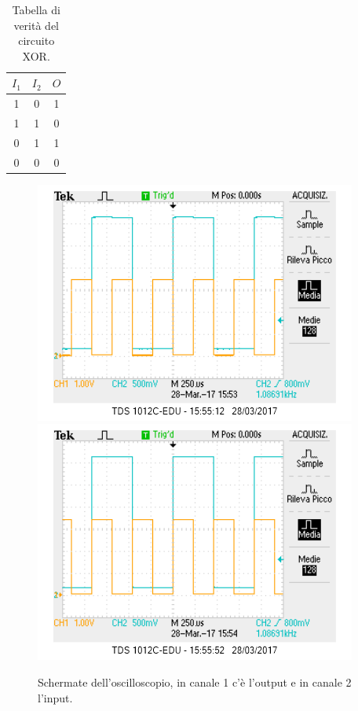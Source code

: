 \documentclass[10pt,a4paper]{article}
\begin{document}
\begin{table}[!htb]
\centering
\begin{tabular}{|c|c|c|}
\hline 
$I_1$ & $I_2$ & $O$ \\
\hline
 1 &  0 & 1\\ 
 
 1 &  1 & 0\\ 

 0 &  1 & 1\\ 

 0 &  0 & 0\\ 
\hline 
\end{tabular} 
\caption{Tabella di verità del circuito XOR.\label{tab:XOR}}
\end{table}

\begin{figure}[!htb]
  \centering
  \includegraphics[scale=0.75]{xor1.png}\includegraphics[scale=0.75]{xor2.png}
\caption{Schermate dell'oscilloscopio, in canale 1 c'è l'output e in canale 2 l'input.\label{osc:XOR}}
\end{figure}
\end{document}
